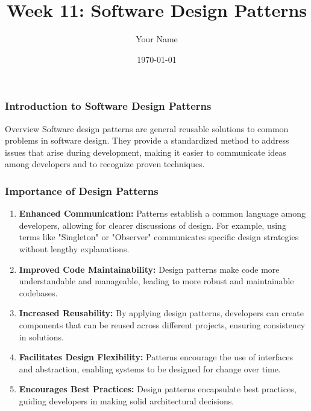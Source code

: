 \documentclass{beamer}
\title{Week 11: Software Design Patterns}
\author{Your Name}
\institute{Your Institution}
\date{\today}
\begin{document}
\frame{\titlepage}

\begin{frame}[fragile]
    \frametitle{Introduction to Software Design Patterns}
    \begin{block}{Overview}
        Software design patterns are general reusable solutions to common problems in software design. They provide a standardized method to address issues that arise during development, making it easier to communicate ideas among developers and to recognize proven techniques.
    \end{block}
\end{frame}

\begin{frame}[fragile]
    \frametitle{Importance of Design Patterns}
    \begin{enumerate}
        \item \textbf{Enhanced Communication:}
        Patterns establish a common language among developers, allowing for clearer discussions of design. For example, using terms like "Singleton" or "Observer" communicates specific design strategies without lengthy explanations.
        
        \item \textbf{Improved Code Maintainability:}
        Design patterns make code more understandable and manageable, leading to more robust and maintainable codebases.

        \item \textbf{Increased Reusability:}
        By applying design patterns, developers can create components that can be reused across different projects, ensuring consistency in solutions.

        \item \textbf{Facilitates Design Flexibility:}
        Patterns encourage the use of interfaces and abstraction, enabling systems to be designed for change over time.

        \item \textbf{Encourages Best Practices:}
        Design patterns encapsulate best practices, guiding developers in making solid architectural decisions.
    \end{enumerate}
\end{frame}
\end{document}
